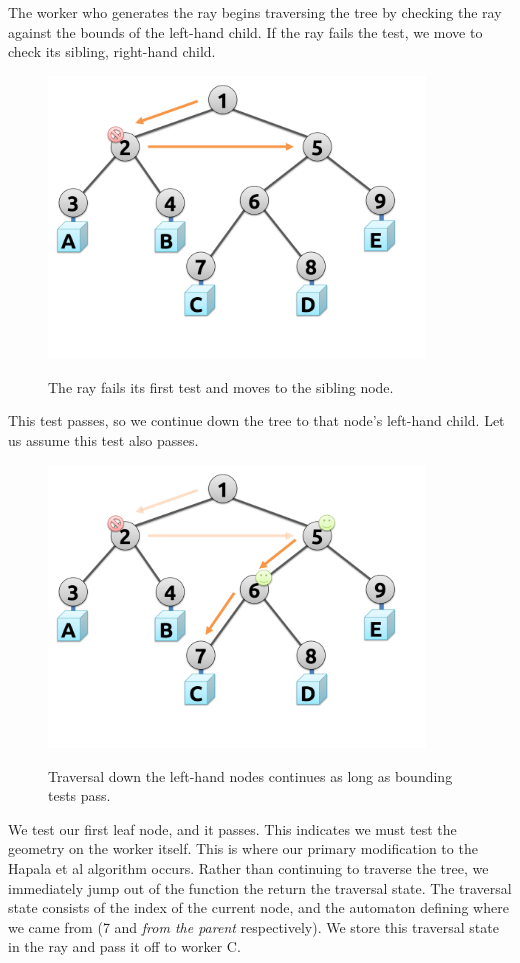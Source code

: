 \documentclass[12pt]{ucthesis}
\newcommand{\captionfonts}{\small\bf\ssp}
\begin{document}
The worker who generates the ray begins traversing the tree by checking the ray
against the bounds of the left-hand child. If the ray fails the test, we move
to check its sibling, right-hand child.

\begin{figure}[H]
    \centering
    \includegraphics[width=100mm]{figures/traversal2.pdf}
    \captionfonts
    \caption{The ray fails its first test and moves to the sibling node.}
    \label{fig:traversal2}
\end{figure}

This test passes, so we continue down the tree to that node's left-hand child.
Let us assume this test also passes.

\begin{figure}[H]
    \centering
    \includegraphics[width=100mm]{figures/traversal3.pdf}
    \captionfonts
    \caption{Traversal down the left-hand nodes continues as long as bounding tests pass.}
    \label{fig:traversal3}
\end{figure}

We test our first leaf node, and it passes. This indicates we must test the
geometry on the worker itself. This is where our primary modification to the
Hapala et al \cite{hapala:2011} algorithm occurs. Rather than continuing to
traverse the tree, we immediately jump out of the function the return the
traversal state. The traversal state consists of the index of the current
node, and the automaton defining where we came from (7 and \emph{from the parent}
respectively). We store this traversal state in the ray and pass it off to worker
C.
\end{document}
